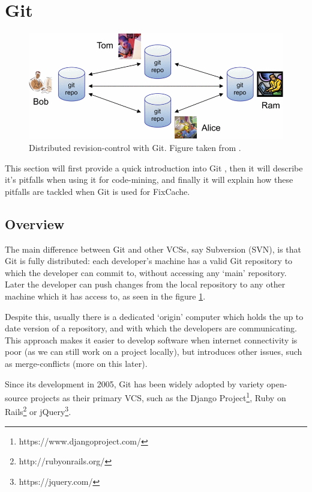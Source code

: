 \documentclass[12pt,twoside,notitlepage]{report}
\newcommand{\fxch}{FixCache}
\begin{document}
\section{Git}\label{section-Git}
\begin{figure}[ht!]
\includegraphics[width=1.0\textwidth]{decentralised_git.png}
\caption[Distributed revision-control with Git]{Distributed revision-control with Git. Figure taken from \cite{TorvaldsGit}.}
\label{decentralised_git}
\end{figure} This section will first provide a quick introduction into Git \cite{TorvaldsGit}, then it will describe it's pitfalls when using it for code-mining, and finally it will explain how these pitfalls are tackled when Git is used for \fxch{}.
\subsection{Overview}
The main difference between Git and other VCSs, say Subversion (SVN), is that Git is fully distributed: each developer's machine has a valid Git repository to which the developer can commit to, without accessing any `main' repository. Later the developer can push changes from the local repository to any other machine which it has access to, as seen in the figure \ref{decentralised_git}.

Despite this, usually there is a dedicated `origin' computer which holds the up to date version of a repository, and with which the developers are communicating. This approach makes it easier to develop software when internet connectivity is poor (as we can still work on a project locally), but introduces other issues, such as merge-conflicts (more on this later). 

Since its development in 2005, Git has been widely adopted by variety open-source projects as their primary VCS, such as the Django Project\footnote{https://www.djangoproject.com/}, Ruby on Rails\footnote{http://rubyonrails.org/} or jQuery\footnote{https://jquery.com/}.
\end{document}
